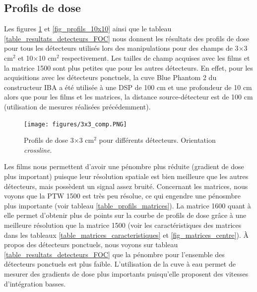 \documentclass{book}
\begin{document}
\subsection{Profils de dose}

Les figures \ref*{fig_profils_3x3}  et \ref*{fig_profils_10x10} ainsi que le tableau \ref*{table_resultats_detecteurs_FOC} nous donnent les résultats des profils de dose pour tous les détecteurs utilisés lors des manipulations pour des champs de 3$\times$3 cm$^2$  et 10$\times$10 cm$^2$ respectivement. Les tailles de champ acquises avec les films et la matrice 1500 sont plus petites que pour les autres détecteurs. En effet, pour les acquisitions avec les détecteurs ponctuels, la cuve Blue Phantom 2 du constructeur IBA a été utilisée à une DSP de 100 cm et une profondeur de 10 cm alors que pour les films et les matrices, la distance source-détecteur est de 100 cm (utilisation de mesures réalisées précédemment).

\begin{figure}[h]
  \centering
  \texttt{[image: figures/3x3\_comp.PNG]}
  \caption{Profils de dose 3$\times$3 cm$^2$ pour différents détecteurs. Orientation \textit{crossline}.}
  \label{fig_profils_3x3}
\end{figure}

Les films nous permettent d'avoir une pénombre plus réduite (gradient de dose plus important) puisque leur résolution spatiale est bien meilleure que les autres détecteurs, mais possèdent un signal assez bruité. Concernant les matrices, nous voyons que la PTW 1500 est très peu résolue, ce qui engendre une pénosmbre plus importante (voir tableau \ref*{table_profils_matrices}). La matrice 1600 quant à elle permet d'obtenir plus de points sur la courbe de profils de dose grâce à une meilleure résolution que la matrice 1500 (voir les caractéristiques des matrices dans les tableaux \ref*{table_matrices_caracteristiques} et \ref*{fig_matrices_centre}). À propos des détecteurs ponctuels, nous voyons sur tableau \ref*{table_resultats_detecteurs_FOC} que la pénombre pour l'ensemble des détecteurs ponctuels est plus faible. L'utilisation de la cuve à eau permet de mesurer des gradients de dose plus importants puisqu'elle proposent des vitesses d'intégration basses.
\end{document}
